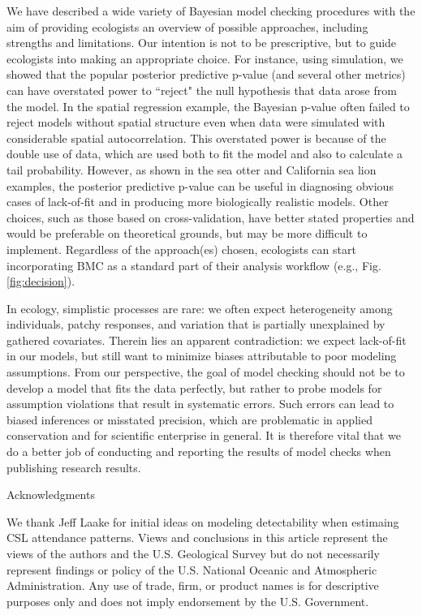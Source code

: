 \documentclass[12pt,english]{article}
\begin{document}
\begin{spacing}{1.9}
We have described a wide variety of Bayesian model checking procedures with the aim of providing ecologists an overview of possible approaches, including strengths and limitations.  Our intention is not to be prescriptive, but to guide ecologists into making an appropriate choice. For instance, using simulation, we showed that the popular posterior predictive p-value (and several other metrics) can have overstated power to ``reject" the null hypothesis that data arose from the model.  In the spatial regression example, the Bayesian p-value often failed to reject models without spatial structure even when data were simulated with considerable spatial autocorrelation.  This overstated power is because of the double use of data, which are used both to fit the model and also to calculate a tail probability.  However, as shown in the sea otter and California sea lion examples, the posterior predictive p-value can be useful in diagnosing obvious cases of lack-of-fit and in producing more biologically realistic models.  Other choices, such as those based on cross-validation, have better stated properties and would be preferable on theoretical grounds, but may be more difficult to implement.  Regardless of the approach(es) chosen, ecologists can start incorporating BMC as a standard part of their analysis workflow (e.g., Fig. \ref{fig:decision}).

In ecology, simplistic processes are rare: we often expect heterogeneity among individuals, patchy responses, and variation that is partially unexplained by gathered covariates.  Therein lies an apparent contradiction: we expect lack-of-fit in our models, but still want to minimize biases attributable to poor modeling assumptions.  From our perspective, the goal of model checking should not be to develop a model that fits the data perfectly, but rather to probe models for assumption violations that result in systematic errors.  Such errors can lead to biased inferences or misstated precision, which are problematic in applied conservation and for scientific enterprise in general.  It is therefore vital that we do a better job of conducting and reporting the results of model checks when publishing research results.





    \centerline{\sc Acknowledgments} We thank Jeff Laake for initial 
    ideas on modeling detectability when estimaing CSL attendance patterns.  
    Views and conclusions in this
    article represent the views of the authors and the U.S. Geological
    Survey but do not necessarily represent findings or policy of the
    U.S. National Oceanic and Atmospheric Administration.  Any use of
    trade, firm, or product names is for descriptive purposes only and
    does not imply endorsement by the U.S. Government.


\end{spacing}
\end{document}
